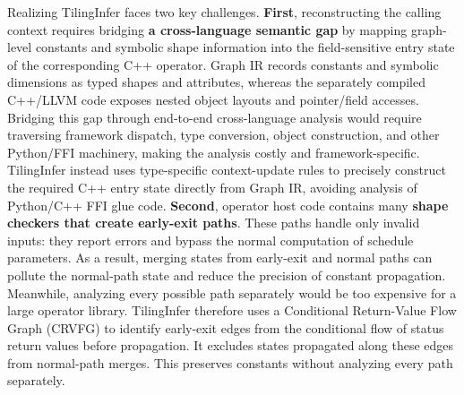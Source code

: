 {\color{red}%
\par}
{\color{blue}%
Realizing TilingInfer faces two key challenges. \textbf{First}, reconstructing the calling context requires bridging \textbf{a cross-language semantic gap} by mapping graph-level constants and symbolic shape information into the field-sensitive entry state of the corresponding C++ operator. Graph IR records constants and symbolic dimensions as typed shapes and attributes, whereas the separately compiled C++/LLVM code exposes nested object layouts and pointer/field accesses. Bridging this gap through end-to-end cross-language analysis would require traversing framework dispatch, type conversion, object construction, and other Python/FFI machinery, making the analysis costly and framework-specific. TilingInfer instead uses type-specific context-update rules to precisely construct the required C++ entry state directly from Graph IR, avoiding analysis of Python/C++ FFI glue code. \textbf{Second}, operator host code contains many \textbf{shape checkers that create early-exit paths}. These paths handle only invalid inputs: they report errors and bypass the normal computation of schedule parameters. As a result, merging states from early-exit and normal paths can pollute the normal-path state and reduce the precision of constant propagation. Meanwhile, analyzing every possible path separately would be too expensive for a large operator library. TilingInfer therefore uses a Conditional Return-Value Flow Graph (CRVFG) to identify early-exit edges from the conditional flow of status return values before propagation. It excludes states propagated along these edges from normal-path merges. This preserves constants without analyzing every path separately.
\par}

